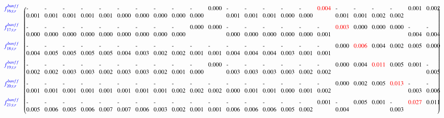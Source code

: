 {\begin{sideways}
\begin{minipage}{23cm}
{\begin{equation*}
\begin{blockarray}{c p{18pt}p{18pt}p{18pt}p{18pt}p{18pt}p{18pt}p{18pt}p{18pt}p{18pt}p{18pt}p{18pt}p{18pt}p{18pt}p{18pt}p{18pt}p{18pt}p{18pt}p{18pt}p{18pt}p{18pt}p{18pt}p{18pt}p{18pt}}
\begin{block}{c(p{18pt}p{18pt}p{18pt}p{18pt}p{18pt}p{18pt}p{18pt}p{18pt}p{18pt}p{18pt}p{18pt}p{18pt}p{18pt}p{18pt}p{18pt}p{18pt}p{18pt}p{18pt}p{18pt}p{18pt}p{18pt}p{18pt}p{18pt}@{\hspace*{1pt}})}
{\color{blue} f_{16; t, r}^{banff}}  \vspace{0.2cm} &     -0.001 &     -0.001 &     -0.001 &     -0.001 &     -0.001 &     -0.000 &     -0.000 &     -0.000 &     -0.000 &     -0.000 &      0.000 &     -0.001 &     -0.001 &     -0.001 &     -0.000 &     -0.000 & {\color{red} 0.004} &     -0.001 &     -0.001 &     -0.002 &     -0.002 &      0.001 &      0.002 \\ 
{\color{blue} f_{17; t, r}^{banff}}  \vspace{0.2cm} &     -0.000 &     -0.000 &     -0.000 &     -0.000 &     -0.000 &     -0.000 &     -0.000 &     -0.000 &     -0.000 &      0.000 &      0.000 &     -0.000 &     -0.000 &     -0.000 &     -0.000 &     -0.000 &     -0.001 & {\color{red} 0.003} &      0.000 &      0.000 &      0.000 &     -0.004 &     -0.004 \\ 
{\color{blue} f_{18; t, r}^{banff}}  \vspace{0.2cm} &     -0.004 &     -0.005 &     -0.005 &     -0.005 &     -0.005 &     -0.004 &     -0.003 &     -0.002 &     -0.002 &     -0.001 &     -0.001 &     -0.004 &     -0.004 &     -0.004 &     -0.003 &     -0.001 &     -0.001 &      0.000 & {\color{red} 0.006} &      0.004 &      0.002 &      0.005 &      0.000 \\ 
{\color{blue} f_{19; t, r}^{banff}}  \vspace{0.2cm} &     -0.002 &     -0.002 &     -0.003 &     -0.003 &     -0.002 &     -0.003 &     -0.003 &     -0.002 &     -0.001 &     -0.000 &      0.000 &     -0.003 &     -0.003 &     -0.003 &     -0.003 &     -0.002 &     -0.002 &      0.000 &      0.004 & {\color{red} 0.011} &      0.005 &      0.001 &     -0.005 \\ 
{\color{blue} f_{20; t, r}^{banff}}  \vspace{0.2cm} &     -0.001 &     -0.001 &     -0.001 &     -0.001 &     -0.001 &     -0.001 &     -0.001 &     -0.001 &     -0.002 &     -0.002 &     -0.002 &     -0.000 &     -0.001 &     -0.001 &     -0.000 &     -0.001 &     -0.002 &      0.000 &      0.002 &      0.005 & {\color{red} 0.013} &     -0.003 &     -0.006 \\ 
{\color{blue} f_{21; t, r}^{banff}}  \vspace{0.2cm} &     -0.005 &     -0.006 &     -0.005 &     -0.006 &     -0.007 &     -0.007 &     -0.006 &     -0.003 &     -0.002 &     -0.001 &     -0.001 &     -0.006 &     -0.006 &     -0.006 &     -0.005 &     -0.002 &      0.001 &     -0.004 &      0.005 &      0.001 &     -0.003 & {\color{red} 0.027} &      0.011 \\ 

\end{block}
\end{blockarray}
\end{equation*}}
\end{minipage}
\end{sideways}}
